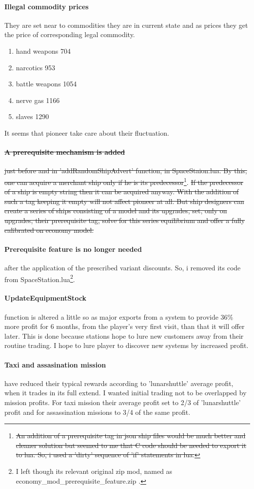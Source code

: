 \documentclass[]{article}
\begin{document}
\paragraph{Illegal commodity prices}
They are set near to commodities they are in current state and as prices they get the price of corresponding legal commodity. 
\begin{enumerate}
	\item hand weapons 704
	\item narcotics 953
	\item battle weapons 1054
	\item nerve gas 1166
	\item slaves 1290
\end{enumerate}
It seems that pioneer take care about their fluctuation.
\paragraph{\sout{A prerequisite mechanism is added}} \sout{ just before and in 'addRandomShipAdvert' function, in SpaceStaion.lua. By this, one can acquire a merchant ship only if he is its predecessor}\footnote{\sout{An addition of a prerequisite tag in json ship files would be much better and cleaner solution but seemed to me that C code should be needed to export it to lua. So, i used a 'dirty' sequence of \textsf{'if'} statements in lua.}}.\sout{ If the predecessor of a ship is empty string then it can be acquired anyway. With the addition of such a tag keeping it empty will not affect pioneer at all. But ship designers can create a series of ships consisting of a model and its upgrades, set, only on upgrades, their prerequisite tag, solve for this series equilibrium and offer a fully calibrated on economy model.}
\paragraph{Prerequisite feature is no longer needed} after the application of the prescribed variant discounts. So, i removed its code from SpaceStation.lua\footnote{I left though its relevant original zip mod, named as economy\_mod\_prerequisite\_feature.zip .}. 
\paragraph{UpdateEquipmentStock} function is altered a little so as major exports from a system to provide 36\% more profit for 6 months, from the player's very first visit, than that it will offer later. This is done because stations hope to lure new customers away from their routine trading. I hope to lure player to discover new systems by increased profit.
\paragraph{Taxi and assasination mission} have reduced their typical rewards according to 'lunarshuttle' average profit, when it trades in its full extend. I wanted initial trading not to be overlapped by mission profits. For taxi mission their average profit set to 2/3 of 'lunarshuttle' profit and for assassination missions to 3/4 of the same profit.
\end{document}
